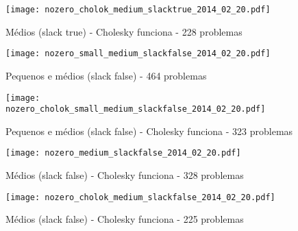 \documentclass{article}
\begin{document}
\begin{figure}[H]
  \centering
  \texttt{[image: nozero\_cholok\_medium\_slacktrue\_2014\_02\_20.pdf]}
  \caption{Médios (slack true) - Cholesky funciona - 228 problemas}
\end{figure}
\begin{figure}[H]
  \centering
  \texttt{[image: nozero\_small\_medium\_slackfalse\_2014\_02\_20.pdf]}
  \caption{Pequenos e médios (slack false) - 464 problemas}
\end{figure}
\begin{figure}[H]
  \centering
  \texttt{[image: nozero\_cholok\_small\_medium\_slackfalse\_2014\_02\_20.pdf]}
  \caption{Pequenos e médios (slack false) - Cholesky funciona - 323 problemas}
\end{figure}
\begin{figure}[H]
  \centering
  \texttt{[image: nozero\_medium\_slackfalse\_2014\_02\_20.pdf]}
  \caption{Médios (slack false) - Cholesky funciona - 328 problemas}
\end{figure}
\begin{figure}[H]
  \centering
  \texttt{[image: nozero\_cholok\_medium\_slackfalse\_2014\_02\_20.pdf]}
  \caption{Médios (slack false) - Cholesky funciona - 225 problemas}
\end{figure}
\end{document}
